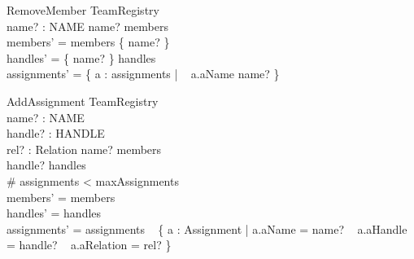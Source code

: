 \documentclass[a4paper,10pt,fleqn]{article}
\begin{document}
\begin{schema}{RemoveMember}
  \Delta TeamRegistry \\
  name? : NAME
\where
  name? \in members \\
  members' = members \setminus \{ name? \} \\
  handles' = \{ name? \} \ndres handles \\
  assignments' = \{ a : assignments |
\quad~ a.aName \neq name? \}
\end{schema}

\begin{schema}{AddAssignment}
  \Delta TeamRegistry \\
  name? : NAME \\
  handle? : HANDLE \\
  rel? : Relation
\where
  name? \in members \\
  handle? \in \ran handles \\
  \# assignments < maxAssignments \\
  members' = members \\
  handles' = handles \\
  assignments' = assignments \cup
\quad~ \{ a : Assignment | a.aName = name?
\quad~ \land a.aHandle = handle?
\quad~ \land a.aRelation = rel? \}
\end{schema}
\end{document}
